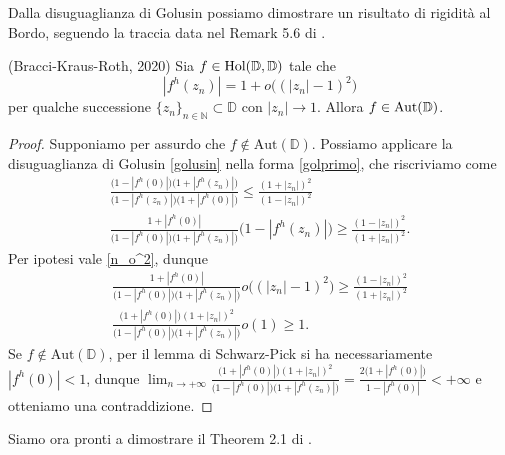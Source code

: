Dalla disuguaglianza di Golusin possiamo dimostrare un risultato di rigidità al Bordo, seguendo la traccia data nel Remark 5.6 di \cite{BKR}.

\begin{thm} \label{boundary_schwarz_pick}
  (Bracci-Kraus-Roth, 2020) Sia $f \in \text{\normalfont{Hol}}(\mathbb{D},\mathbb{D})$ tale che
  \begin{equation} \label{n_o^2}
    |f^h(z_n)|=1+o\bigl((|z_n|-1)^2\bigr)
  \end{equation}
  per qualche successione $\{z_n\}_{n \in \mathbb{N}} \subset \mathbb{D}$ con $|z_n| \longrightarrow 1$. Allora $f \in \text{\normalfont{Aut}}(\mathbb{D})$.
\end{thm}

\begin{proof}
  Supponiamo per assurdo che $f \not\in \text{Aut}(\mathbb{D})$. Possiamo applicare la disuguaglianza di Golusin \ref{golusin} nella forma \eqref{golprimo}, che riscriviamo come
  \begin{align*}
    \frac{\bigl(1-|f^h(0)|\bigr)\bigl(1+|f^h(z_n)|\bigr)}{\bigl(1-|f^h(z_n)|\bigr)\bigl(1+|f^h(0)|\bigr)} \le \frac{(1+|z_n|)^2}{(1-|z_n|)^2} \\
    \frac{1+|f^h(0)|}{\bigl(1-|f^h(0)|\bigr)\bigl(1+|f^h(z_n)|\bigr)}\bigl(1-|f^h(z_n)|\bigr) \ge \frac{(1-|z_n|)^2}{(1+|z_n|)^2}.
  \end{align*}
  Per ipotesi vale \eqref{n_o^2}, dunque
  \begin{align*}
    \frac{1+|f^h(0)|}{\bigl(1-|f^h(0)|\bigr)\bigl(1+|f^h(z_n)|\bigr)}o\bigl((|z_n|-1)^2\bigr) \ge \frac{(1-|z_n|)^2}{(1+|z_n|)^2} \\
    \frac{\bigl(1+|f^h(0)|\bigr)(1+|z_n|)^2}{\bigl(1-|f^h(0)|\bigr)\bigl(1+|f^h(z_n)|\bigr)}o(1) \ge 1.
  \end{align*}
  Se $f \not\in \text{Aut}(\mathbb{D})$, per il lemma di Schwarz-Pick si ha necessariamente $|f^h(0)|<1$, dunque $\displaystyle \lim_{n \longrightarrow +\infty} \frac{\bigl(1+|f^h(0)|\bigr)(1+|z_n|)^2}{\bigl(1-|f^h(0)|\bigr)\bigl(1+|f^h(z_n)|\bigr)}=\frac{2\bigl(1+|f^h(0)|\bigr)}{1-|f^h(0)|} < +\infty$ e otteniamo una contraddizione.
\end{proof}

Siamo ora pronti a dimostrare il Theorem 2.1 di \cite{BK}.
